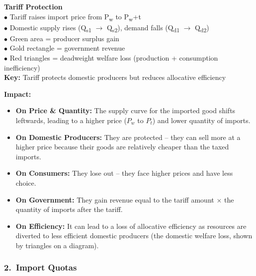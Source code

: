 \documentclass[11pt, a4paper, twoside]{book}
\begin{document}
\begin{diagrambox}
{%
}{%
\textbf{\color{NavyPrimary}Tariff Protection}\\[4pt]
$\bullet$ Tariff raises import price from P\textsubscript{w} to P\textsubscript{w}+t\\[2pt]
$\bullet$ Domestic supply rises (Q\textsubscript{s1} \(\rightarrow\) Q\textsubscript{s2}), demand falls (Q\textsubscript{d1} \(\rightarrow\) Q\textsubscript{d2})\\[2pt]
$\bullet$ Green area = producer surplus gain\\[2pt]
$\bullet$ Gold rectangle = government revenue\\[2pt]
$\bullet$ Red triangles = deadweight welfare loss (production + consumption inefficiency)\\[2pt]
\textbf{\color{GoldAccent}Key:} Tariff protects domestic producers but reduces allocative efficiency%
}
\end{diagrambox}

\textbf{Impact:}
\begin{itemize}
  \item \textbf{On Price \& Quantity:} The supply curve for the imported good shifts leftwards, leading to a higher price ($P_w$ to $P_t$) and lower quantity of imports.
  \item \textbf{On Domestic Producers:} They are protected -- they can sell more at a higher price because their goods are relatively cheaper than the taxed imports.
  \item \textbf{On Consumers:} They lose out -- they face higher prices and have less choice.
  \item \textbf{On Government:} They gain revenue equal to the tariff amount $\times$ the quantity of imports after the tariff.
  \item \textbf{On Efficiency:} It can lead to a loss of allocative efficiency as resources are diverted to less efficient domestic producers (the domestic welfare loss, shown by triangles on a diagram).
\end{itemize}

\subsubsection{2.\ Import Quotas}
\end{document}
